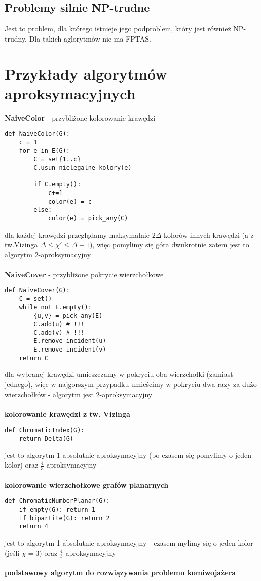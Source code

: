 \documentclass{article}
\begin{document}
\subsection{Problemy silnie NP-trudne}
Jest to problem, dla którego istnieje jego podproblem,  który jest również NP-trudny.
Dla takich aglorytmów nie ma FPTAS.

\section{Przykłady algorytmów aproksymacyjnych}

\textbf{NaiveColor} - przybliżone kolorowanie krawędzi
\begin{lstlisting}
def NaiveColor(G):
	c = 1
	for e in E(G):
		C = set{1..c}
		C.usun_nielegalne_kolory(e)

		if C.empty():
			c+=1
			color(e) = c
		else:	
			color(e) = pick_any(C)
\end{lstlisting}
dla każdej krawędzi przeglądamy maksymalnie $2\Delta$ kolorów innych krawędzi (a z tw.Vizinga $\Delta \leq \chi' \leq \Delta + 1$), więc pomylimy się góra dwukrotnie zatem jest to algorytm 2-aproksymacyjny \\\\
\textbf{NaiveCover} - przybliżone pokrycie wierzchołkowe
\begin{lstlisting}
def NaiveCover(G):
	C = set()
	while not E.empty():
		{u,v} = pick_any(E)		
		C.add(u) # !!!
		C.add(v) # !!!
		E.remove_incident(u)
		E.remove_incident(v)
	return C
\end{lstlisting}
dla wybranej krawędzi umieszczamy w pokryciu oba wierzchołki (zamiast jednego), więc w najgorszym przypadku umieścimy w pokryciu dwa razy za dużo wierzchołków - algorytm jest 2-aproksymacyjny\\\\
\textbf{kolorowanie krawędzi z tw. Vizinga}
\begin{lstlisting}
def ChromaticIndex(G):
	return Delta(G)
\end{lstlisting}
jest to algorytm 1-absolutnie aproksymacyjny (bo czasem się pomylimy o jeden kolor) oraz $\frac{4}{3}$-aproksymacyjny \\\\
\textbf{kolorowanie wierzchołkowe grafów planarnych}
\begin{lstlisting}
def ChromaticNumberPlanar(G):
	if empty(G): return 1
	if bipartite(G): return 2
	return 4
\end{lstlisting}
jest to algorytm 1-absolutnie aproksymacyjny - czasem mylimy się o jeden kolor (jeśli $\chi = 3$) oraz $\frac{4}{3}$-aproksymacyjny \\\\
\textbf{podstawowy algorytm do rozwiązywania problemu komiwojażera}
\end{document}
